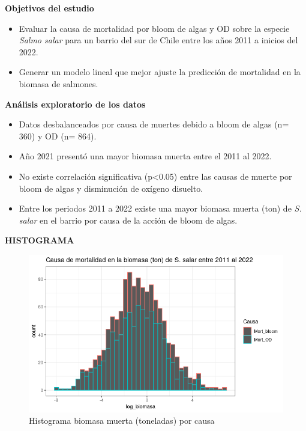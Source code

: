 \documentclass[
  ignorenonframetext,
]{beamer}
\begin{document}
\begin{frame}{\textbf{Objetivos del estudio}}
\protect\hypertarget{objetivos-del-estudio}{}
\begin{itemize}
\item
  Evaluar la causa de mortalidad por bloom de algas y OD sobre la
  especie \emph{Salmo salar} para un barrio del sur de Chile entre los
  años 2011 a inicios del 2022.
\item
  Generar un modelo lineal que mejor ajuste la predicción de mortalidad
  en la biomasa de salmones.
\end{itemize}
\end{frame}

\begin{frame}{\textbf{Análisis exploratorio de los datos}}
\protect\hypertarget{anuxe1lisis-exploratorio-de-los-datos}{}
\begin{itemize}
\item
  Datos desbalanceados por causa de muertes debido a bloom de algas (n=
  360) y OD (n= 864).
\item
  Año 2021 presentó una mayor biomasa muerta entre el 2011 al 2022.
\item
  No existe correlación significativa (p\textless0.05) entre las causas
  de muerte por bloom de algas y disminución de oxígeno disuelto.
\item
  Entre los periodos 2011 a 2022 existe una mayor biomasa muerta (ton)
  de \emph{S. salar} en el barrio por causa de la acción de bloom de
  algas.
\end{itemize}
\end{frame}

\begin{frame}{\textbf{HISTOGRAMA}}
\protect\hypertarget{histograma}{}
\begin{figure}

{\centering \includegraphics[width=0.9\linewidth]{Histograma_biomasa_muerta_causa} 

}

\caption{Histograma biomasa muerta (toneladas) por causa}\label{fig:unnamed-chunk-1}
\end{figure}
\end{frame}
\end{document}
